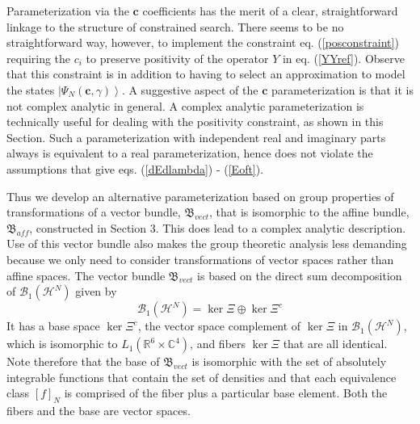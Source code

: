 \documentclass[aps,preprint]{revtex4}%
\begin{document}
Parameterization via the $\mathbf{c}$ coefficients has the merit of a clear,
straightforward linkage to the structure of constrained search. There seems to
be no straightforward way, however, to implement the constraint eq.
(\ref{posconstraint}) requiring the $c_{i}$ to preserve positivity of the
operator $Y$ in eq. (\ref{YYref}). Observe that this constraint is in addition
to having to select an approximation to model the states $\left|  \Psi
_{N}(\mathbf{c},\gamma)\right\rangle $. A suggestive aspect of the
$\mathbf{c}$ parameterization is that it is not complex analytic in general. A
complex analytic parameterization is technically useful for dealing with the
positivity constraint, as shown in this Section. Such a parameterization with
independent real and imaginary parts always is equivalent to a real
parameterization, hence does not violate the assumptions that give eqs.
(\ref{dEdlambda}) - (\ref{Eoft}).

Thus we develop an alternative parameterization based on group properties of
transformations of a vector bundle, $\mathfrak{B}_{vect}$, that is isomorphic
to the affine bundle, $\mathfrak{B}_{aff}$, constructed in Section 3. This
does lead to a complex analytic description. Use of this vector bundle also
makes the group theoretic analysis less demanding because we only need to
consider transformations of vector spaces rather than affine spaces. The
vector bundle $\mathfrak{B}_{vect}$ is based on the direct sum decomposition
of $\mathcal{B}_{1}\left(  \mathcal{H}^{N}\right)  $ given by
\begin{equation}
\mathcal{B}_{1}\left(  \mathcal{H}^{N}\right)  =\ker\Xi\oplus\ker\Xi^{c}
\label{directsum}%
\end{equation}
It has a base space $\ker\Xi^{c}$, the vector space complement of $\ker\Xi$ in
$\mathcal{B}_{1}\left(  \mathcal{H}^{N}\right)  $, which is isomorphic to
$L_{1}(\mathbb{R}^{6}\times\mathbb{C}^{4})$, and fibers $\ker\Xi$ that are all
identical. Note therefore that the base of $\mathfrak{B}_{vect}$ is isomorphic
with the set of absolutely integrable functions that contain the set of
densities and that each equivalence class $[f]_{N}$ is comprised of the fiber
plus a particular base element. Both the fibers and the base are vector spaces.
\end{document}
